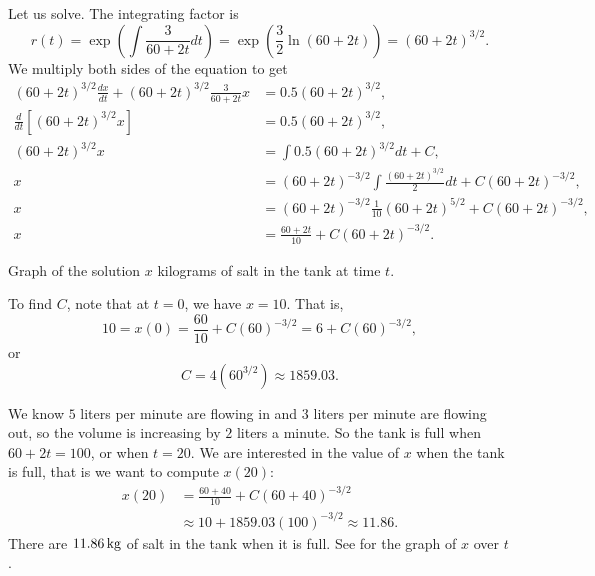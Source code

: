 \begin{example}
Let us solve.  The integrating factor is
\begin{equation*}
r(t) = \exp \left( \int \frac{3}{60+2t} dt  \right)
=
\exp \left( \frac{3}{2} \ln (60+2t) \right)
=
{(60+2t)}^{3/2} .
\end{equation*}
We multiply both sides of the equation to get
\begin{align*}
{(60+2t)}^{3/2} \frac{dx}{dt} +
{(60+2t)}^{3/2} \frac{3}{60+2t} x
& =
0.5{(60+2t)}^{3/2} ,\\
\frac{d}{dt}\left[
{(60+2t)}^{3/2} x \right]
& =
0.5{(60+2t)}^{3/2} ,\\
{(60+2t)}^{3/2} x
& =
\int 
0.5{(60+2t)}^{3/2}
dt
+C ,\\
 x
& =
{(60+2t)}^{-3/2} \int 
\frac{
{(60+2t)}^{3/2}
}{2}
dt
+C{(60+2t)}^{-3/2} ,\\
 x
& =
{(60+2t)}^{-3/2}
\frac{1}{10}{(60+2t)}^{5/2}
+C{(60+2t)}^{-3/2} ,\\
 x
& =
\frac{60+2t}{10}
+C{(60+2t)}^{-3/2} .
\end{align*}

\begin{mywrapfig}{3.25in}
\capstart
{}
\caption{Graph of the solution $x$ kilograms of salt in the tank at time
$t$.\label{linear-salt-graph:fig}}
\end{mywrapfig}
%
%
To find $C$, note that at $t=0$, we have $x=10$.  That is,
\begin{equation*}
10 = x(0)
=
\frac{60}{10}
+C{(60)}^{-3/2}
=
6
+C{(60)}^{-3/2} ,
\end{equation*}
or
\begin{equation*}
C=4 ({60}^{3/2}) \approx 1859.03 .
\end{equation*}

We know $5$ liters per minute are flowing in and $3$ liters per minute are flowing out,
so the volume is increasing by $2$ liters a minute.
So the tank is
full when $60+2t = 100$, or when $t=20$.
We are interested in the value of $x$ when the tank is full,
that is we want to compute $x(20)$:
\begin{equation*}
\begin{split}
x(20) & = 
\frac{60+40}{10}
+C{(60+40)}^{-3/2}
\\
& \approx
10
+1859.03 {(100)}^{-3/2}
\approx
11.86 .
\end{split}
\end{equation*}
There are $\unit[11.86]{kg}$ of salt in the tank when it is full.
See  for the graph of $x$ over $t$.


\end{example}

